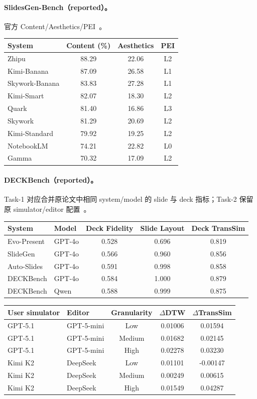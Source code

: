 \paragraph{SlidesGen-Bench（reported）。} 官方 Content/Aesthetics/PEI~\citep{yang2026slidesgenbench}。
\begin{center}\small
\begin{tabular}{lccc}
\toprule System & Content (\%) & Aesthetics & PEI \\
\midrule
Zhipu & 88.29 & 22.06 & L2 \\
Kimi-Banana & 87.09 & 26.58 & L1 \\
Skywork-Banana & 83.83 & 27.28 & L1 \\
Kimi-Smart & 82.07 & 18.30 & L2 \\
Quark & 81.40 & 16.86 & L3 \\
Skywork & 81.29 & 20.69 & L2 \\
Kimi-Standard & 79.92 & 19.25 & L2 \\
NotebookLM & 74.21 & 22.82 & L0 \\
Gamma & 70.32 & 17.09 & L2 \\
\bottomrule
\end{tabular}
\end{center}

\paragraph{DECKBench（reported）。} Task-1 对应合并原论文中相同 system/model 的 slide 与 deck 指标；Task-2 保留原 simulator/editor 配置~\citep{jang2026deckbench}。
\begin{center}\small
\begin{tabular}{llccc}
\toprule System & Model & Deck Fidelity & Slide Layout & Deck TransSim \\
\midrule
Evo-Present & GPT-4o & 0.528 & 0.696 & 0.819 \\
SlideGen & GPT-4o & 0.566 & 0.960 & 0.856 \\
Auto-Slides & GPT-4o & 0.591 & 0.998 & 0.858 \\
DECKBench & GPT-4o & 0.584 & 1.000 & 0.879 \\
DECKBench & Qwen & 0.588 & 0.999 & 0.875 \\
\bottomrule
\end{tabular}
\end{center}
\begin{center}\small
\begin{tabular}{llccc}
\toprule User simulator & Editor & Granularity & $\Delta$DTW & $\Delta$TransSim \\
\midrule
GPT-5.1 & GPT-5-mini & Low & 0.01006 & 0.01594 \\
GPT-5.1 & GPT-5-mini & Medium & 0.01682 & 0.02145 \\
GPT-5.1 & GPT-5-mini & High & 0.02278 & 0.03230 \\
Kimi K2 & DeepSeek & Low & 0.01101 & -0.00147 \\
Kimi K2 & DeepSeek & Medium & 0.00249 & 0.00615 \\
Kimi K2 & DeepSeek & High & 0.01549 & 0.04287 \\
\bottomrule
\end{tabular}
\end{center}


